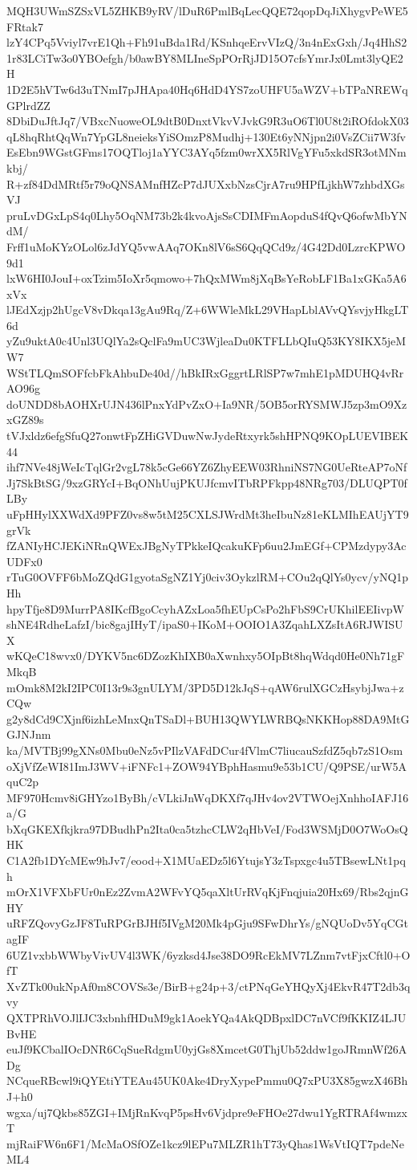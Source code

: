 MQH3UWmSZSxVL5ZHKB9yRV/lDuR6PmlBqLecQQE72qopDqJiXhygvPeWE5FRtak7
lzY4CPq5Vviyl7vrE1Qh+Fh91uBda1Rd/KSnhqeErvVIzQ/3n4nExGxh/Jq4HhS2
1r83LCiTw3o0YBOefgh/b0awBY8MLIneSpPOrRjJD15O7cfsYmrJx0Lmt3lyQE2H
1D2E5hVTw6d3uTNmI7pJHApa40Hq6HdD4YS7zoUHFU5aWZV+bTPaNREWqGPlrdZZ
8DbiDuJftJq7/VBxcNuoweOL9dtB0DnxtVkvVJvkG9R3uO6Tl0U8t2iROfdokX03
qL8hqRhtQqWn7YpGL8neieksYiSOmzP8Mudhj+130Et6yNNjpn2i0VsZCii7W3fv
EsEbn9WGstGFms17OQTloj1aYYC3AYq5fzm0wrXX5RlVgYFu5xkdSR3otMNmkbj/
R+zf84DdMRtf5r79oQNSAMnfHZcP7dJUXxbNzsCjrA7ru9HPfLjkhW7zhbdXGsVJ
pruLvDGxLpS4q0Lhy5OqNM73b2k4kvoAjsSsCDIMFmAopduS4fQvQ6ofwMbYNdM/
Frff1uMoKYzOLol6zJdYQ5vwAAq7OKn8lV6sS6QqQCd9z/4G42Dd0LzrcKPWO9d1
lxW6HI0JouI+oxTzim5IoXr5qmowo+7hQxMWm8jXqBsYeRobLF1Ba1xGKa5A6xVx
lJEdXzjp2hUgcV8vDkqa13gAu9Rq/Z+6WWleMkL29VHapLblAVvQYsvjyHkgLT6d
yZu9uktA0c4Unl3UQlYa2sQclFa9mUC3WjleaDu0KTFLLbQIuQ53KY8IKX5jeMW7
WStTLQmSOFfcbFkAhbuDe40d//hBkIRxGggrtLRlSP7w7mhE1pMDUHQ4vRrAO96g
doUNDD8bAOHXrUJN436lPnxYdPvZxO+Ia9NR/5OB5orRYSMWJ5zp3mO9XzxGZ89s
tVJxldz6efgSfuQ27onwtFpZHiGVDuwNwJydeRtxyrk5shHPNQ9KOpLUEVIBEK44
ihf7NVe48jWeIcTqlGr2vgL78k5cGe66YZ6ZhyEEW03RhniNS7NG0UeRteAP7oNf
Jj7SkBtSG/9xzGRYcI+BqONhUujPKUJfcmvITbRPFkpp48NRg703/DLUQPT0fLBy
uFpHHylXXWdXd9PFZ0vs8w5tM25CXLSJWrdMt3heIbuNz81eKLMIhEAUjYT9grVk
fZANIyHCJEKiNRnQWExJBgNyTPkkeIQcakuKFp6uu2JmEGf+CPMzdypy3AcUDFx0
rTuG0OVFF6bMoZQdG1gyotaSgNZ1Yj0civ3OykzlRM+COu2qQlYs0ycv/yNQ1pHh
hpyTfje8D9MurrPA8IKcfBgoCcyhAZxLoa5fhEUpCsPo2hFbS9CrUKhilEEIivpW
shNE4RdheLafzI/bic8gajIHyT/ipaS0+IKoM+OOIO1A3ZqahLXZsItA6RJWISUX
wKQeC18wvx0/DYKV5nc6DZozKhIXB0aXwnhxy5OIpBt8hqWdqd0He0Nh71gFMkqB
mOmk8M2kI2IPC0I13r9s3gnULYM/3PD5D12kJqS+qAW6rulXGCzHsybjJwa+zCQw
g2y8dCd9CXjnf6izhLeMnxQnTSaDl+BUH13QWYLWRBQsNKKHop88DA9MtGGJNJnm
ka/MVTBj99gXNs0Mbu0eNz5vPIlzVAFdDCur4fVlmC7liucauSzfdZ5qb7zS1Osm
oXjVfZeWI81ImJ3WV+iFNFc1+ZOW94YBphHasmu9e53b1CU/Q9PSE/urW5AquC2p
MF970Hcmv8iGHYzo1ByBh/cVLkiJnWqDKXf7qJHv4ov2VTWOejXnhhoIAFJ16a/G
bXqGKEXfkjkra97DBudhPn2Ita0ca5tzhcCLW2qHbVeI/Fod3WSMjD0O7WoOsQHK
C1A2fb1DYcMEw9hJv7/eood+X1MUaEDz5l6YtujsY3zTspxgc4u5TBsewLNt1pqh
mOrX1VFXbFUr0nEz2ZvmA2WFvYQ5qaXltUrRVqKjFnqjuia20Hx69/Rbs2qjnGHY
uRFZQovyGzJF8TuRPGrBJHf5IVgM20Mk4pGju9SFwDhrYs/gNQUoDv5YqCGtagIF
6UZ1vxbbWWbyVivUV4l3WK/6yzksd4Jse38DO9RcEkMV7LZnm7vtFjxCftl0+OfT
XvZTk00ukNpAf0m8COVSs3e/BirB+g24p+3/ctPNqGeYHQyXj4EkvR47T2db3qvy
QXTPRhVOJlIJC3xbnhfHDuM9gk1AoekYQa4AkQDBpxlDC7nVCf9fKKIZ4LJUBvHE
euJf9KCbalIOcDNR6CqSueRdgmU0yjGs8XmcetG0ThjUb52ddw1goJRmnWf26ADg
NCqueRBcwl9iQYEtiYTEAu45UK0Ake4DryXypePmmu0Q7xPU3X85gwzX46BhJ+h0
wgxa/uj7Qkbs85ZGI+IMjRnKvqP5psHv6Vjdpre9eFHOe27dwu1YgRTRAf4wmzxT
mjRaiFW6n6F1/McMaOSfOZe1kcz9lEPu7MLZR1hT73yQhas1WsVtIQT7pdeNeML4
